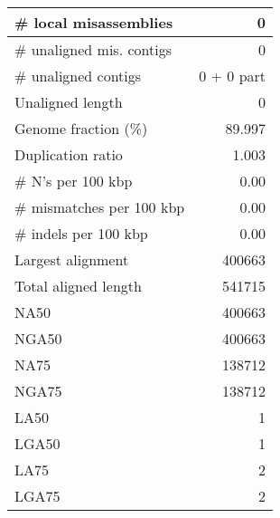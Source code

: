 \documentclass[12pt,a4paper]{article}
\begin{document}
\begin{table}[ht]
\begin{center}
\begin{tabular}{|l*{1}{|r}|}
\# local misassemblies & 0 \\ \hline
\# unaligned mis. contigs & 0 \\ \hline
\# unaligned contigs & 0 + 0 part \\ \hline
Unaligned length & 0 \\ \hline
Genome fraction (\%) & 89.997 \\ \hline
Duplication ratio & 1.003 \\ \hline
\# N's per 100 kbp & 0.00 \\ \hline
\# mismatches per 100 kbp & 0.00 \\ \hline
\# indels per 100 kbp & 0.00 \\ \hline
Largest alignment & 400663 \\ \hline
Total aligned length & 541715 \\ \hline
NA50 & 400663 \\ \hline
NGA50 & 400663 \\ \hline
NA75 & 138712 \\ \hline
NGA75 & 138712 \\ \hline
LA50 & 1 \\ \hline
LGA50 & 1 \\ \hline
LA75 & 2 \\ \hline
LGA75 & 2 \\ \hline
\end{tabular}
\end{center}
\end{table}
\end{document}
